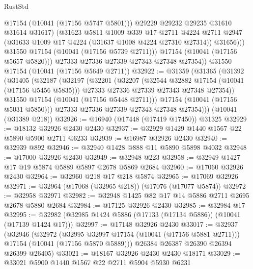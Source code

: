 \begin{lexlean}{RustStd}
\begin{coremodule}
                    @17154
                    (@10041 (@17156 @5747 @5801)))
                  @29229
                  @29232
                  @29235
                  @31610
                  @31614
                  @31617)
                (@31623
                  @5811
                  @1009
                  @339
                  @17
                  @2711
                  @4224
                  @2711
                  @2947
                  (@31633 @1009 @17 @4224 (@31637 @1008 @4224 @27310 @27314))
                  @31656)))
            @31550
            @17154
            (@10041 (@17156 @5739 @2711)))
          @17154
          (@10041 (@17156 @5657 @5820)))
        @27333
        @27336
        @27339
        @27343
        @27348
        @27354))
    @31550
    @17154
    (@10041 (@17156 @5649 @2711))
@32922 := @31359
    (@31365
      (@31392
        (@31405
          (@32187
            (@32197
              (@32201
                (@32207
                  (@32544 @32882 @17154 (@10041 (@17156 @5456 @5835)))
                  @27333
                  @27336
                  @27339
                  @27343
                  @27348
                  @27354))
              @31550
              @17154
              (@10041 (@17156 @5448 @2711)))
            @17154
            (@10041 (@17156 @5031 @5850)))
          @27333
          @27336
          @27339
          @27343
          @27348
          @27354)))
    (@10041 (@31389 @218))
@32926 := @16940 (@17448 (@17419 @17450)) @31325
@32929 := @18132 @32926 @2430 @2430
@32937 := @32929 @1429 @1440 @1567 @22 @5890 @5900 @2711 @6233
@32939 := @16987 @32926 @2430
@32940 := @32939 @892
@32946 := @32940 @1428 @888 @11 @5890 @5898 @4032
@32948 := @17000 @32926 @2430
@32949 := @32948 @223
@32958 := @32949 @1427 @17 @19 @5874 @5889 @5897 @2678 @5869 @2684
@32960 := @17060 @32926 @2430
@32964 := @32960 @218 @17 @218 @5874
@32965 := @17069 @32926
@32971 := @32964 (@17068 (@32965 @218)) (@17076 (@17077 @5874))
@32972 := @32958 @32971
@32982 := @32948 @1425 @82 @17 @14 @5886 @2711 @2695 @2678 @5880 @2684
@32984 := @17125 @32926 @2430
@32985 := @32984 @17
@32995 := @32982 (@32985 @1424 @5886 (@17133 (@17134 @5886)) (@10041 (@17139 @1424 @17)))
@32997 := @17148 @32926 @2430
@33017 := @32937
    (@32946
      (@32972
        (@32995 @32997 @17154 (@10041 (@17156 @5881 @2711)))
        @17154
        (@10041 (@17156 @5870 @5889)))
      @26384
      @26387
      @26390
      @26394
      @26399
      @26405)
@33021 := @18167 @32926 @2430 @2430 @18171
@33029 := @33021 @5900 @1440 @1567 @22 @2711 @5904 @5930 @6231

\end{coremodule}
\end{lexlean}

